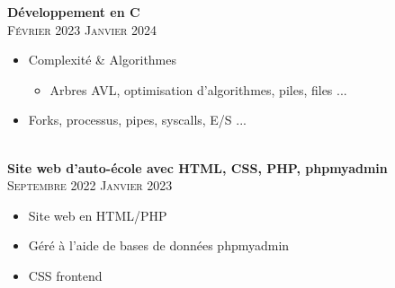 \documentclass[oneside]{article}
\begin{document}
{\begin{minipage}[t][\dimexpr\textheight-2\fboxrule-2\fboxsep\relax][t]{\dimexpr0.6\textwidth-2\fboxrule-2\fboxsep\relax}
        {\large \textbf{Développement en C}} \\
        {\scshape{}\selectfont\footnotesize Février 2023 \textendash{} Janvier 2024} \\
        \vspace{-\baselineskip}
        \vspace{0.2cm}
        \begin{itemize}
            \setlength{\itemsep}{-5pt}
            \item Complexité \& Algorithmes
            \vspace{-\baselineskip}
            \vspace{0.2cm}
            \begin{itemize}
                \item Arbres AVL, optimisation d'algorithmes, piles, files ...
            \end{itemize}
            \item Forks, processus, pipes, syscalls, E/S ...
        \end{itemize} \\

        {\large \textbf{Site web d'auto-école avec HTML, CSS, PHP, phpmyadmin}} \\
        {\scshape{}\selectfont\footnotesize Septembre 2022 \textendash{} Janvier 2023} \\
        \vspace{-\baselineskip}
        \vspace{0.2cm}
        \begin{itemize}
            \setlength{\itemsep}{-5pt}
            \item Site web en HTML/PHP
            \item Géré à l'aide de bases de données phpmyadmin
            \item CSS frontend
        \end{itemize} \\
        
        \vfill%
    \end{minipage}
}%
\end{document}
